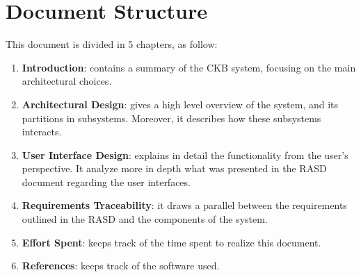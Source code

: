 \section{Document Structure}
This document is divided in 5 chapters, as follow:
\begin{enumerate}
	\item \textbf{Introduction}: contains a summary of the CKB system, focusing on the main architectural choices.

	\item \textbf{Architectural Design}: gives a high level overview of the system, and its partitions in subsystems. Moreover, it describes how these subsystems interacts.

	\item \textbf{User Interface Design}: explains in detail the functionality from the user's perspective. It analyze more in depth what was presented in the RASD document regarding the user interfaces.

	\item \textbf{Requirements Traceability}: it draws a parallel between the requirements outlined in the RASD and the components of the system.

	\item \textbf{Effort Spent}: keeps track of the time spent to realize this document.

        \item \textbf{References}: keeps track of the software used.
\end{enumerate}